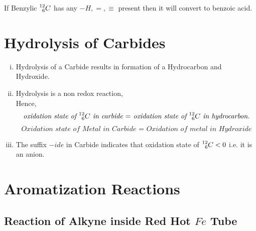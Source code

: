 \documentclass{article}
\begin{document}
If Benzylic $\prescript{12}{6}{C}$ has any $-H, = , \equiv$ present then it will convert to benzoic acid.
\section{Hydrolysis of Carbides}
\begin{enumerate}[i.]
    \item Hydrolysis of a Carbide results in formation of a Hydrocarbon and Hydroxide.
    \item Hydrolysis is a non redox reaction,\\
          Hence, $$\textit{oxidation state of $\prescript{12}{6}{C}$ in carbide $=$ oxidation state of $\prescript{12}{6}{C}$ in hydrocarbon.}$$
          $$\textit{Oxidation state of Metal in Carbide = Oxidation of metal in Hydroxide}$$
    \item The suffix $-ide$ in Carbide indicates that oxidation state of $\prescript{12}{6}{C} <0$ i.e. it is an anion.
\end{enumerate}
\section{Aromatization Reactions}
\subsection{Reaction of Alkyne inside Red Hot $Fe$ Tube}
\end{document}
